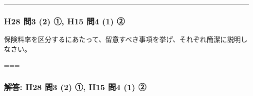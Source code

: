 \documentclass[]{article}
\begin{document}
\begin{center}\rule{0.5\linewidth}{0.5pt}\end{center}

\hypertarget{h28-ux554f3-2-ux2460-h15-ux554f4-1-ux2461}{%
\subsubsection{H28 問3 (2) ①, H15 問4 (1)
②}\label{h28-ux554f3-2-ux2460-h15-ux554f4-1-ux2461}}

保険料率を区分するにあたって、留意すべき事項を挙げ、それぞれ簡潔に説明しなさい。

===

\hypertarget{ux89e3ux7b54-h28-ux554f3-2-ux2460-h15-ux554f4-1-ux2461}{%
\subsubsection{解答: H28 問3 (2) ①, H15 問4 (1)
②}\label{ux89e3ux7b54-h28-ux554f3-2-ux2460-h15-ux554f4-1-ux2461}}
\end{document}
